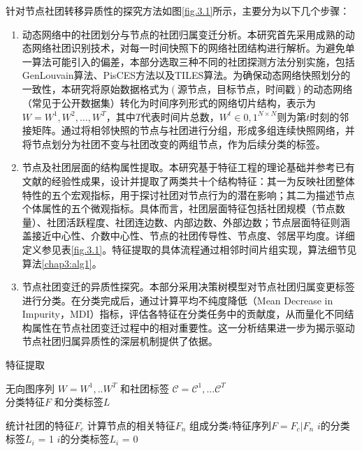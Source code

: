 针对节点社团转移异质性的探究方法如图\ref{fig.3.1}所示，主要分为以下几个步骤：

\begin{enumerate}
\item 动态网络中的社团划分与节点的社团归属变迁分析。本研究首先采用成熟的动态网络社团识别技术，对每一时间快照下的网络社团结构进行解析。为避免单一算法可能引入的偏差，本部分选取三种不同的社团探测方法分别实施，包括GenLouvain算法\cite{GenLouvain}、PisCES方法\cite{PisCes}以及TILES算法\cite{rossetti2017tiles}。为确保动态网络快照划分的一致性，本研究将原始数据格式为$(源节点，目标节点，时间戳)$的动态网络（常见于公开数据集）转化为时间序列形式的网络切片结构，表示为$W={W^1, W^2, \dots, W^T}$，其中$T$代表时间片总数，$W^t \in {0,1}^{N \times N}$则为第$t$时刻的邻接矩阵。通过将相邻快照的节点与社团进行分组，形成多组连续快照网络，并将节点划分为社团不变与社团改变的两组节点，作为后续分类的标签。

\item 节点及社团层面的结构属性提取。本研究基于特征工程的理论基础并参考已有文献的经验性成果\cite{ilhan2016feature}，设计并提取了两类共十个结构特征：其一为反映社团整体特性的五个宏观指标，用于探讨社团对节点行为的潜在影响；其二为描述节点个体属性的五个微观指标。具体而言，社团层面特征包括社团规模（节点数量）、社团活跃程度、社团连边数、内部边数、外部边数；节点层面特征则涵盖接近中心性、介数中心性、节点的社团传导性、节点度、邻居平均度。详细定义参见表\ref{fig.3.1}。特征提取的具体流程通过相邻时间片组实现，算法细节见算法\ref{chap3:alg1}。

\item 节点社团变迁的异质性探究。本部分采用决策树模型对节点社团归属变更标签进行分类。在分类完成后，通过计算平均不纯度降低（Mean Decrease in Impurity，MDI）指标，评估各特征在分类任务中的贡献度，从而量化不同结构属性在节点社团变迁过程中的相对重要性。这一分析结果进一步为揭示驱动节点社团归属异质性的深层机制提供了依据。
\end{enumerate}

\begin{algorithm}[!htbp]
	\caption{特征提取}
	\label{chap3:alg1}
	\algorithmicrequire \quad 无向图序列 $W = {W}^1,..{W}^T$ 和社团标签 $\mathcal{C} = \mathcal{C}^1,...\mathcal{C}^T$\\
	\algorithmicensure \quad 分类特征$F$ 和分类标签$L$
	\begin{algorithmic}[1]
		\STATE 统计社团的特征$F_c$
		\STATE 计算节点的相关特征$F_n$
		\STATE 组成分类$i$特征序列$F = F_c \vert F_n$
		\STATE $i$的分类标签$L_i$ = 1
		\ELSE
		\STATE $i$的分类标签$L_i$ = 0
		\ENDIF
		\ENDFOR
		\ENDFOR
		\ENDFOR
	\end{algorithmic}
\end{algorithm}

